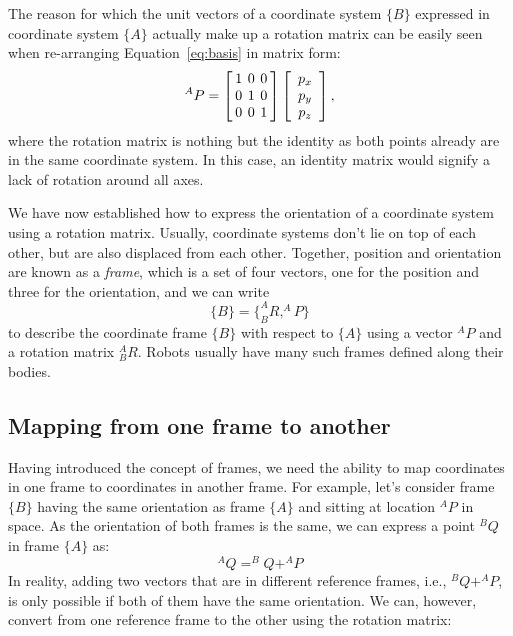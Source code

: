 The reason for which the unit vectors of a coordinate system $\{B\}$ expressed in coordinate system $\{A\}$ actually make up a rotation matrix can be easily seen when re-arranging Equation~\ref{eq:basis} in matrix form:
\begin{equation}
^AP=\left[ \arraycolsep=2pt%
\begin{array}{ccc}1 & 0 & 0\\0 & 1 & 0\\0 & 0 & 1\end{array}\right]\left[\begin{array}{c}p_x\\p_y\\p_z\end{array}
\right],
\end{equation}
where the rotation matrix is nothing but the identity as both points already are in the same coordinate system. In this case, an identity matrix would signify a lack of rotation around all axes.

We have now established how to express the orientation of a coordinate system using a rotation matrix. Usually, coordinate systems don't lie on top of each other, but are also displaced from each other.
Together, position and orientation are known as a \textsl{frame}, which is a set of four vectors, one for the position and three for the orientation, and we can write
%
\begin{equation}
\{B\}=\{^A_BR, ^AP\}
\end{equation}
%
to describe the coordinate frame $\{B\}$ with respect to $\{A\}$ using a vector $^AP$ and a rotation matrix $^A_BR$. Robots usually have many such frames defined along their bodies.

\subsection{Mapping from one frame to another}


Having introduced the concept of frames, we need the ability to map coordinates in one frame to coordinates in another frame. For example, let's consider frame $\{B\}$ having the same orientation as frame $\{A\}$ and sitting at location $^AP$ in space. As the orientation of both frames is the same, we can express a point $ ^BQ$ in frame $\{A\}$ as:
%
\begin{equation}
^AQ=^BQ+^AP
\end{equation}
%
In reality, adding two vectors that are in different reference frames, i.e., $ ^BQ+^AP$, is only possible if both of them have the same orientation. We can, however, convert from one reference frame to the other using the rotation matrix:


